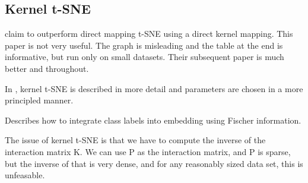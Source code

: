 \documentclass[11pt]{article}
\begin{document}
\subsection{Kernel t-SNE}
\cite{gisbrecht2012out} claim to outperform direct mapping t-SNE using a direct kernel mapping. This paper is not very useful. The graph is misleading and the table at the end is informative, but run only on small datasets. Their subsequent paper is much better and throughout.

In \cite{gisbrecht2015parametric}, kernel t-SNE is described in more detail and parameters are chosen in a more principled manner.

Describes how to integrate class labels into embedding using Fischer information.

The issue of kernel t-SNE is that we have to compute the inverse of the interaction matrix K. We can use P as the interaction matrix, and P is sparse, but the inverse of that is very dense, and for any reasonably sized data set, this is unfeasable.




\end{document}
